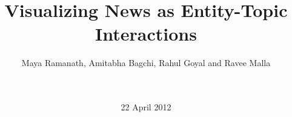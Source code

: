 \documentclass{acm_proc_article-sp}
\begin{document}
\title{Visualizing News as Entity-Topic Interactions}
%
%
%
%
%

%
\author{
%
%
\alignauthor 
Maya Ramanath, Amitabha Bagchi, Rahul Goyal and Ravee Malla\\
  \\
  \\
}
\date{22 April 2012}
\end{document}
